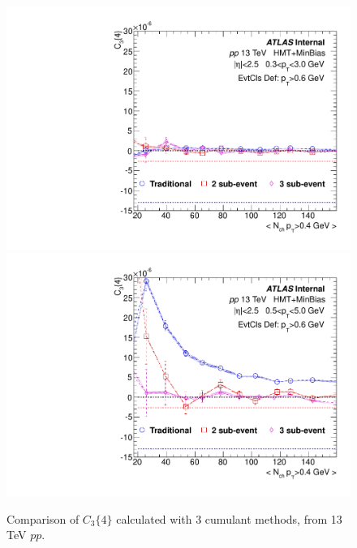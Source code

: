 \begin{figure}[p]
\includegraphics[width=0.4\linewidth]{figs/sec_result/pp13/phy_4PC_Har1_Pt0_Cls3.pdf}
\includegraphics[width=0.4\linewidth]{figs/sec_result/pp13/phy_4PC_Har1_Pt1_Cls3.pdf}
\caption{Comparison of $C_{3}\{4\}$ calculated with 3 cumulant methods, from 13 TeV $pp$.}
\label{fig:result_pp13_C34}
\end{figure}
\clearpage






